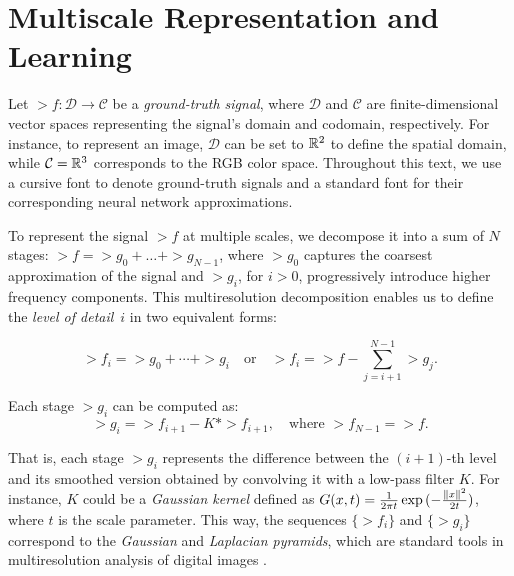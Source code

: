 




\section{Multiscale Representation and Learning}
\label{s-motivation}


Let $\gt{f}:\mathcal{D}\to \mathcal{C}$ be a \textit{ground-truth signal}, where $\mathcal{D}$ and $\mathcal{C}$ are finite-dimensional vector spaces representing the signal's domain and codomain, respectively. For instance, to represent an image, $\mathcal{D}$ can be set to $\mathbb{R}^2$ to define the spatial domain, while $\mathcal{C}=\mathbb{R}^3$ corresponds to the RGB color space. Throughout this text, we use a cursive font to denote ground-truth signals and a standard font for their corresponding neural network approximations.

To represent the signal $\gt{f}$ at multiple scales, we decompose it into a sum of $N$ stages: $\gt{f}=\gt{g}_0+\dots+\gt{g}_{N-1}$, where $\gt{g}_0$ captures the coarsest approximation of the signal and $\gt{g}_i$, for $i>0$, progressively introduce higher frequency components. This multiresolution decomposition enables us to define the \textit{level of detail}~$i$ in two equivalent forms:

\begin{equation}
\gt{f}_i = \gt{g}_0 + \cdots + \gt{g}_i \quad \text{or} \quad \gt{f}_i = \gt{f} - \sum_{j=i+1}^{N-1} \gt{g}_j.
\end{equation}

Each stage $\gt{g}_i$ can be computed as:
\begin{equation}
\gt{g}_i = \gt{f}_{i+1} - K * \gt{f}_{i+1}, \quad \text{where } \gt{f}_{N-1} = \gt{f}.
\end{equation}

That is, each stage $\gt{g}_i$ represents the difference between the $(i+1)$-th level and its smoothed version obtained by convolving it with a low-pass filter $K$. For instance, $K$ could be a \textit{Gaussian kernel} defined as $G(x,t)=\frac{1}{2\pi t}\exp{(-\frac{\lVert x\rVert^2}{2t})}$, where $t$ is the scale parameter. This way, the sequences $\{\gt{f}_i\}$ and $\{\gt{g}_i\}$ correspond to the \textit{Gaussian} and \textit{Laplacian pyramids}, which are standard tools in multiresolution analysis of digital images \citep{lindeberg1994scale, velho2009image, rosenfeld2013multiresolution}.

